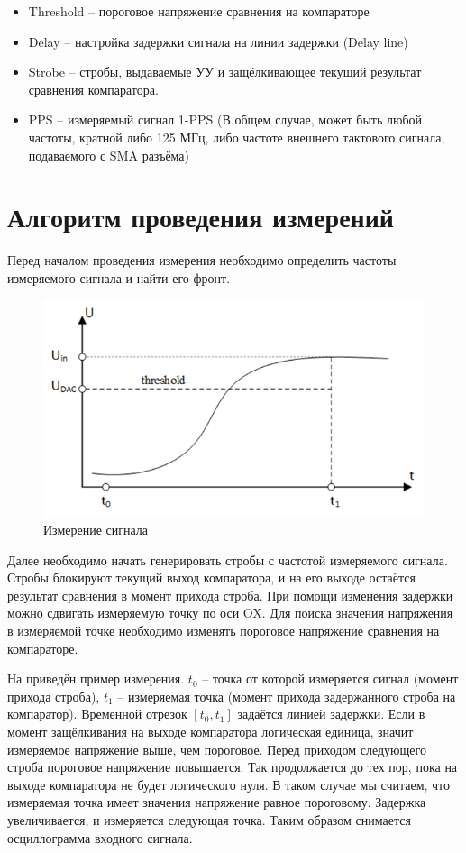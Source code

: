 \begin{itemize}[label={}]
	\item Threshold -- пороговое напряжение сравнения на компараторе
	\item Delay -- настройка задержки сигнала на линии задержки (Delay line)
	\item Strobe -- стробы, выдаваемые УУ и защёлкивающее текущий результат сравнения компаратора.
	\item PPS -- измеряемый сигнал 1-PPS (В общем случае, может быть любой частоты, кратной либо 125 МГц,
		либо частоте внешнего тактового сигнала, подаваемого с SMA разъёма)\\
\end{itemize}

\section{Алгоритм проведения измерений}

Перед началом проведения измерения необходимо определить частоты измеряемого сигнала и найти его фронт.

\begin{figure}[ht!] 
	\center
	\includegraphics {my_folder/images//meas_alg}
	\caption{Измерение сигнала} 
	\label{fig:meas-alg}  
\end{figure}

Далее необходимо начать генерировать стробы с частотой измеряемого сигнала. Стробы блокируют
текущий выход компаратора, и на его выходе остаётся результат сравнения в момент прихода строба.
При помощи изменения задержки можно сдвигать измеряемую точку по оси OX.
Для поиска значения напряжения в измеряемой точке необходимо изменять пороговое напряжение сравнения
на компараторе.

На  приведён пример измерения. 
$ t_{0} $ -- точка от которой измеряется сигнал (момент прихода строба),
$ t_{1} $ -- измеряемая точка (момент прихода задержанного строба на компаратор).
Временной отрезок $ [t_{0}, t_{1}] $ задаётся линией задержки.
Если в момент защёлкивания на выходе компаратора логическая единица, значит измеряемое напряжение выше,
чем пороговое. Перед приходом следующего строба пороговое напряжение повышается.
Так продолжается до тех пор, пока на выходе компаратора не будет логического нуля.
В таком случае мы считаем, что измеряемая точка имеет значения напряжение равное пороговому.
Задержка увеличивается, и измеряется следующая точка. Таким образом снимается осциллограмма входного сигнала.


